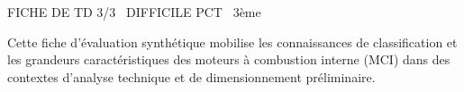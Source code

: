 \documentclass[11pt]{article}
\begin{document}
\begin{tcolorbox}[enhanced,colback=popink,colframe=popink,arc=10pt,boxrule=0pt,left=12pt,right=12pt,top=9pt,bottom=9pt]
{\color{white}\popxbold\small FICHE DE TD 3/3 \textbullet\ DIFFICILE \hfill PCT \textbullet\ 3ème\par}
\end{tcolorbox}
\vspace{4pt}
Cette fiche d'évaluation synthétique mobilise les connaissances de classification et les grandeurs caractéristiques des moteurs à combustion interne (MCI) dans des contextes d'analyse technique et de dimensionnement préliminaire.
\end{document}
